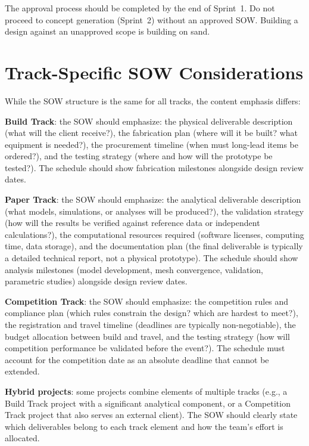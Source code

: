 The approval process should be completed by the end of Sprint~1. Do not proceed to concept generation (Sprint~2) without an approved SOW. Building a design against an unapproved scope is building on sand.



\section{Track-Specific SOW Considerations}
While the SOW structure is the same for all tracks, the content emphasis differs:

\textbf{Build Track}: the SOW should emphasize: the physical deliverable description (what will the client receive?), the fabrication plan (where will it be built? what equipment is needed?), the procurement timeline (when must long-lead items be ordered?), and the testing strategy (where and how will the prototype be tested?). The schedule should show fabrication milestones alongside design review dates.

\textbf{Paper Track}: the SOW should emphasize: the analytical deliverable description (what models, simulations, or analyses will be produced?), the validation strategy (how will the results be verified against reference data or independent calculations?), the computational resources required (software licenses, computing time, data storage), and the documentation plan (the final deliverable is typically a detailed technical report, not a physical prototype). The schedule should show analysis milestones (model development, mesh convergence, validation, parametric studies) alongside design review dates.

\textbf{Competition Track}: the SOW should emphasize: the competition rules and compliance plan (which rules constrain the design? which are hardest to meet?), the registration and travel timeline (deadlines are typically non-negotiable), the budget allocation between build and travel, and the testing strategy (how will competition performance be validated before the event?). The schedule must account for the competition date as an absolute deadline that cannot be extended.

\textbf{Hybrid projects}: some projects combine elements of multiple tracks (e.g., a Build Track project with a significant analytical component, or a Competition Track project that also serves an external client). The SOW should clearly state which deliverables belong to each track element and how the team's effort is allocated.



